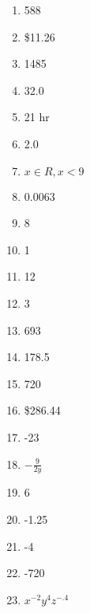 \documentclass[../uilmath.tex]{subfiles}
\begin{document}
\begin{enumerate}[label=\bfseries\arabic*.]
    \item %
    588

    \item %
    \$11.26 

    \item %
    1485

    \item %
    32.0

    \item %
    21 hr
    
    \item %
    2.0

    \item %
    $x\in R, x<9$

    \item %
    0.0063

    \item %
    8

    \item %
    1

    \item %
    12

    \item %
    3

    \item %
    693

    \item %
    178.5

    \item %
    720

    \item %
    \$286.44

    \item %
    -23

    \item %
    $-\frac{9}{2y}$

    \item %
    6

    \item %
    -1.25

    \item %
    -4

    \item %
    -720

    \item %
    $x^{-2}y^4z^{-.4}$


\end{enumerate}
\end{document}
